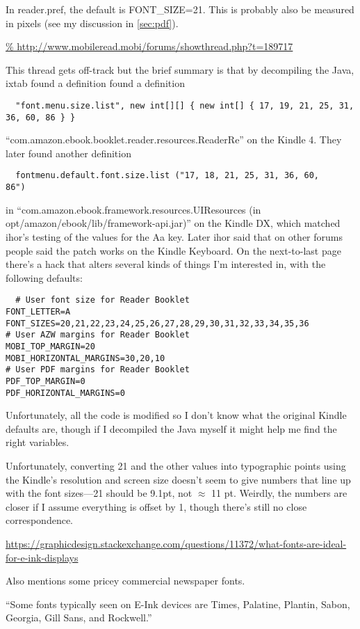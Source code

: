 \documentclass[12pt]{article}
\begin{document}
In reader.pref, the default is FONT\_SIZE=21.  This is probably also be
measured in pixels (see my discussion in \ref{sec:pdf}).

\url{%
http://www.mobileread.mobi/forums/showthread.php?t=189717
}

This thread gets off-track but the brief summary is that by
decompiling the Java, ixtab found a definition
found a definition
\begin{lstlisting}
  "font.menu.size.list", new int[][] { new int[] { 17, 19, 21, 25, 31, 36, 60, 86 } }
\end{lstlisting}
``com.amazon.ebook.booklet.reader.resources.ReaderRe'' on the Kindle
4.  They later found another definition
\begin{lstlisting}
  fontmenu.default.font.size.list ("17, 18, 21, 25, 31, 36, 60,
86")
\end{lstlisting}
in ``com.amazon.ebook.framework.resources.UIResources (in
opt/amazon/ebook/lib/framework-api.jar)'' on the Kindle DX, which
matched ihor's testing of the values for the Aa key.  Later ihor said
that on other forums people said the patch works on the Kindle
Keyboard.  On the next-to-last page there's a hack that alters several
kinds of things I'm interested in, with the following defaults:
\begin{lstlisting}
  # User font size for Reader Booklet
FONT_LETTER=A
FONT_SIZES=20,21,22,23,24,25,26,27,28,29,30,31,32,33,34,35,36
# User AZW margins for Reader Booklet
MOBI_TOP_MARGIN=20
MOBI_HORIZONTAL_MARGINS=30,20,10
# User PDF margins for Reader Booklet
PDF_TOP_MARGIN=0
PDF_HORIZONTAL_MARGINS=0
\end{lstlisting}
Unfortunately, all the code is modified so I don't know what the
original Kindle defaults are, though if I decompiled the Java myself
it might help me find the right variables.

Unfortunately, converting 21 and the other values into typographic
points using the Kindle's resolution and screen size doesn't seem to
give numbers that line up with the font sizes---21 should be 9.1pt,
not $\approx$ 11 pt.  Weirdly, the numbers are closer if I assume
everything is offset by 1, though there's still no close
correspondence.


\url{https://graphicdesign.stackexchange.com/questions/11372/what-fonts-are-ideal-for-e-ink-displays}

Also mentions some pricey commercial newspaper fonts.

``Some fonts typically seen on E-Ink devices are Times, Palatine, Plantin, Sabon, Georgia, Gill Sans, and Rockwell.''
\end{document}
